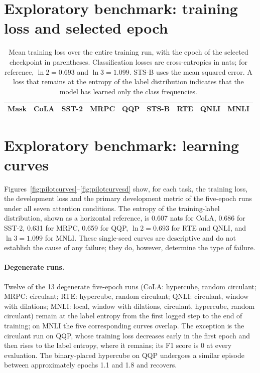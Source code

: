 \documentclass[10pt]{article}
\begin{document}
\section{Exploratory benchmark: training loss and selected epoch}
\label{app:loss}

\begin{table}[H]
\centering
\caption{Mean training loss over the entire training run, with the epoch of the selected checkpoint in parentheses. Classification losses are cross-entropies in nats; for reference, $\ln2=0.693$ and $\ln3=1.099$. STS-B uses the mean squared error. A loss that remains at the entropy of the label distribution indicates that the model has learned only the class frequencies.}
\label{tab:loss}
\setlength{\tabcolsep}{3pt}
\scriptsize
\begin{tabular}{lcccccccc}
\toprule
Mask & CoLA & SST-2 & MRPC & QQP & STS-B & RTE & QNLI & MNLI \\
\midrule

\end{tabular}
\end{table}

\section{Exploratory benchmark: learning curves}
\label{app:curves}

Figures~\ref{fig:pilotcurves}--\ref{fig:pilotcurvesd} show, for each task, the training loss, the development loss and the primary development metric of the five-epoch runs under all seven attention conditions. The entropy of the training-label distribution, shown as a horizontal reference, is 0.607 nats for CoLA, 0.686 for SST-2, 0.631 for MRPC, 0.659 for QQP, $\ln2=0.693$ for RTE and QNLI, and $\ln3=1.099$ for MNLI. These single-seed curves are descriptive and do not establish the cause of any failure; they do, however, determine the type of failure.

\paragraph{Degenerate runs.} Twelve of the 13 degenerate five-epoch runs (CoLA: hypercube, random circulant; MRPC: circulant; RTE: hypercube, random circulant; QNLI: circulant, window with dilations; MNLI: local, window with dilations, circulant, hypercube, random circulant) remain at the label entropy from the first logged step to the end of training; on MNLI the five corresponding curves overlap. The exception is the circulant run on QQP, whose training loss decreases early in the first epoch and then rises to the label entropy, where it remains; its F1 score is 0 at every evaluation. The binary-placed hypercube on QQP undergoes a similar episode between approximately epochs 1.1 and 1.8 and recovers.
\end{document}
